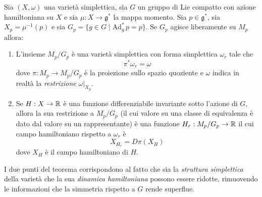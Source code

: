 \begin{theorem}
  Sia $(X,\omega)$ una varietà simplettica, sia $G$ un gruppo di Lie compatto con azione hamiltoniana su $X$ e sia $\mu:  X \to \mathfrak{g}^*$ la mappa momento. Sia $p \in \mathfrak{g}^*$, sia $X_p = \mu^{-1}(p)$ e sia $G_p = \{g \in G \mid \mathrm{Ad}_g^*\, p = p\}$. Se $G_p$ agisce liberamente su $M_p$ allora:
  \begin{enumerate}
    \item L'insieme $M_p/G_p$ è una varietà simplettica con forma simplettica $\omega_r$ tale che \begin{equation*}
    \pi^* \omega_r = \omega
    \end{equation*} 
    dove $\pi:M_p \to M_p/G_p$ è la proiezione sullo spazio quoziente e $\omega$ indica in realtà la \emph{restrizione} $\omega|_{X_p}$.
    \item Se $H:X\to \mathbb{R}$ è una funzione differenziabile invariante sotto l'azione di $G$, allora la sua restrizione a $M_p/G_p$ (il cui valore su una classe di equivalenza è dato dal valore su un rappresentante) è una funzione $H_r:M_p/G_p \to \mathbb{R}$ il cui campo hamiltoniano rispetto a $\omega_r$ è \begin{equation*}
    X_{H_r} = D \pi(X_H)
    \end{equation*}
    dove $X_H$ è il campo hamiltoniano di $H$.
  \end{enumerate}
\end{theorem}
\begin{remark}
  I due punti del teorema corrispondono al fatto che sia la \emph{struttura simplettica} della varietà che la sua \emph{dinamica hamiltoniana} possono essere ridotte, rimuovendo le informazioni che la simmetria rispetto a $G$ rende superflue.
\end{remark}